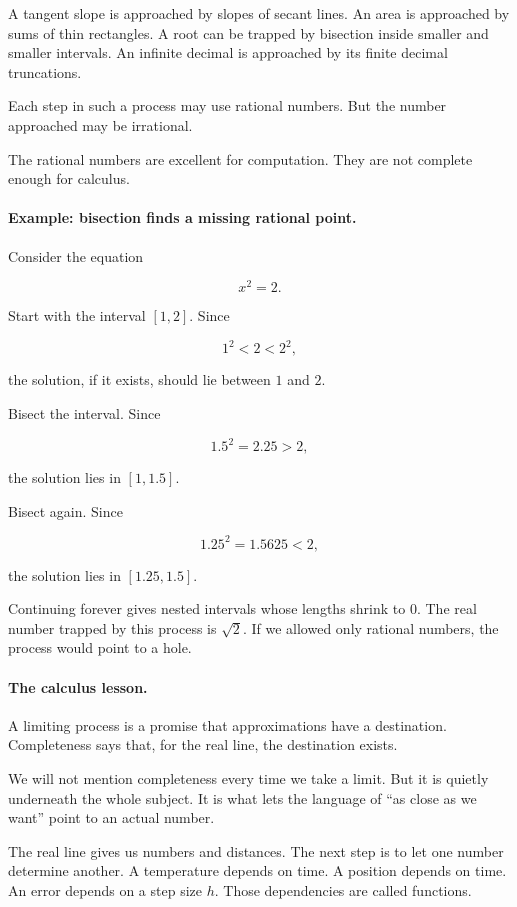 A tangent slope is approached by slopes of secant lines. An area is approached by sums of thin rectangles. A root can be trapped by bisection inside smaller and smaller intervals. An infinite decimal is approached by its finite decimal truncations.

Each step in such a process may use rational numbers. But the number approached may be irrational.

The rational numbers are excellent for computation. They are not complete enough for calculus.

\paragraph{Example: bisection finds a missing rational point.}
Consider the equation

\[
x^2=2.
\]

Start with the interval \([1,2]\). Since

\[
1^2<2<2^2,
\]

the solution, if it exists, should lie between \(1\) and \(2\).

Bisect the interval. Since

\[
1.5^2=2.25>2,
\]

the solution lies in \([1,1.5]\).

Bisect again. Since

\[
1.25^2=1.5625<2,
\]

the solution lies in \([1.25,1.5]\).

Continuing forever gives nested intervals whose lengths shrink to \(0\). The real number trapped by this process is \(\sqrt2\). If we allowed only rational numbers, the process would point to a hole.

\paragraph{The calculus lesson.}
A limiting process is a promise that approximations have a destination. Completeness says that, for the real line, the destination exists.

We will not mention completeness every time we take a limit. But it is quietly underneath the whole subject. It is what lets the language of ``as close as we want'' point to an actual number.

The real line gives us numbers and distances. The next step is to let one number determine another. A temperature depends on time. A position depends on time. An error depends on a step size \(h\). Those dependencies are called functions.
